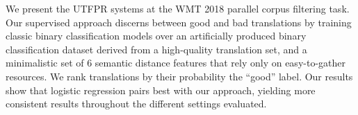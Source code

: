 We present the UTFPR systems at the WMT 2018 parallel corpus filtering task. Our supervised approach discerns between good and bad translations by training classic binary classification models over an artificially produced binary classification dataset derived from a high-quality translation set, and a minimalistic set of 6 semantic distance features that rely only on easy-to-gather resources. We rank translations by their probability the ``good'' label. Our results show that logistic regression pairs best with our approach, yielding more consistent results throughout the different settings evaluated.
